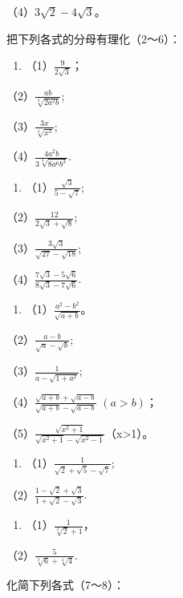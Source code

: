 （4）\(3\sqrt{2} - 4\sqrt{3}\)。

把下列各式的分母有理化（2～6）：

\begin{enumerate}[start=2]
\item
  （1）\(\frac{9}{2\sqrt{3}}\)；
\end{enumerate}

（2）\(\frac{ab}{\sqrt[3]{2a^2b}};\)

（3）\(\frac{3x}{\sqrt[4]{x^3}};\)

（4）\(\frac{4a^2b}{3\sqrt[3]{8a^6b^3}}.\)

\begin{enumerate}[start=3]
\item
  （1）\(\frac{\sqrt{3}}{5 - \sqrt{7}};\)
\end{enumerate}

（2）\(\frac{12}{2\sqrt{3} + \sqrt{8}};\)

（3）\(\frac{3\sqrt{3}}{\sqrt{27} - \sqrt{18}};\)

（4）\(\frac{7\sqrt{3} - 5\sqrt{6}}{8\sqrt{3} - 7\sqrt{6}}.\)

\begin{enumerate}[start=4]
\item
  （1）\(\frac{a^2 - b^2}{\sqrt{a + b}}\)。
\end{enumerate}

（2）\(\frac{a - b}{\sqrt{a} - \sqrt{b}};\)

（3）\(\frac{1}{a - \sqrt{1 + a^2}};\)

（4）\(\frac{\sqrt{a + b} + \sqrt{a - b}}{\sqrt{a + b} - \sqrt{a - b}}\) \((a > b)\)；

（5）\(\frac{\sqrt{x^2 + 1}}{\sqrt{x^2 + 1} - \sqrt{x^2 - 1}}\)（x\textgreater1）。

\begin{enumerate}[start=5]
\item
  （1）\(\frac{1}{\sqrt{2} + \sqrt{5} - \sqrt{7}};\)
\end{enumerate}

（2）\(\frac{1 - \sqrt{2} + \sqrt{3}}{1 + \sqrt{2} - \sqrt{3}}.\)

\begin{enumerate}[start=6]
\item
  （1）\(\frac{1}{\sqrt[3]{2} + 1}\)，
\end{enumerate}

（2）\(\frac{5}{\sqrt[3]{6} + \sqrt[4]{4}}.\)

化简下列各式（7～8）：

